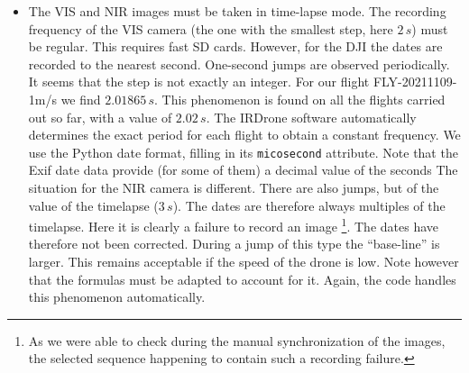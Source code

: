 \documentclass[a4paper,11pt]{report}
\begin{document}
\begin{itemize}
	\item The VIS and NIR images must be taken in time-lapse mode.
	The recording frequency of the VIS camera (the one with the smallest step, here $2\,s$) must be regular.
	This requires fast SD cards. However, for the DJI the dates are recorded to the nearest second. One-second jumps are observed periodically. It seems that the step is not exactly an integer. For our flight FLY-20211109-1m/s we find $2.01865 \, s$. This phenomenon is found on all the flights carried out so far, with a value of $2.02 \, s$. The IRDrone software automatically determines the exact period for each flight to obtain a constant frequency.
	We use the Python date format, filling in its \texttt{micosecond} attribute.
	Note that the Exif date data provide (for some of them) a decimal value of the seconds
	The situation for the NIR camera is different. There are also jumps, but of the value of the timelapse ($3\,s$). The dates are therefore always multiples of the timelapse. Here it is clearly a failure to record an image
	\footnote{As we were able to check during the manual synchronization of the images, the selected sequence happening to contain such a recording failure.}. The dates have therefore not been corrected. During a jump of this type the ``base-line'' is larger. This remains acceptable if the speed of the drone is low. Note however that the formulas must be adapted to account for it. Again, the code handles this phenomenon automatically.\\


\end{itemize}
\end{document}
